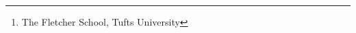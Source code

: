 \author{Ben Mazzotta\thanks{The Fletcher School, Tufts University}}
\date{\today}
\usepackage{times}
\usepackage{euler}
\usepackage{longtable}
